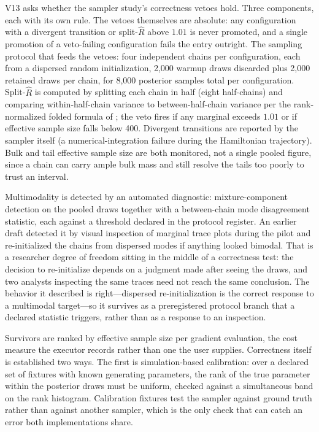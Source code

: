 V13 asks whether the sampler study's correctness vetoes hold. Three
components, each with its own rule. The vetoes themselves are
absolute: any configuration with a divergent transition or
split-$\widehat{R}$ above $1.01$ is never promoted, and a single
promotion of a veto-failing configuration fails the entry outright.
The sampling protocol that feeds the vetoes: four independent chains
per configuration, each from a dispersed random initialization, 2,000
warmup draws discarded plus 2,000 retained draws per chain, for 8,000
posterior samples total per configuration. Split-$\widehat{R}$ is
computed by splitting each chain in half (eight half-chains) and
comparing within-half-chain variance to between-half-chain variance
per the rank-normalized folded formula of \citet{vehtari2021rhat}; the
veto fires if any marginal exceeds $1.01$ or if effective sample size
falls below 400. Divergent transitions are reported by the sampler
itself (a numerical-integration failure during the Hamiltonian
trajectory). Bulk and tail effective sample size are both monitored, not
a single pooled figure, since a chain can carry ample bulk mass and
still resolve the tails too poorly to trust an interval.

Multimodality is detected by an automated diagnostic: mixture-component
detection on the pooled draws together with a between-chain mode
disagreement statistic, each against a threshold declared in the
protocol register. An earlier draft detected it by visual inspection of
marginal trace plots during the pilot and re-initialized the chains from
dispersed modes if anything looked bimodal. That is a researcher degree
of freedom sitting in the middle of a correctness test: the decision to
re-initialize depends on a judgment made after seeing the draws, and two
analysts inspecting the same traces need not reach the same conclusion.
The behavior it described is right—dispersed re-initialization is the
correct response to a multimodal target—so it survives as a
preregistered protocol branch that a declared statistic triggers, rather
than as a response to an inspection.

Survivors are ranked by effective sample size per gradient evaluation,
the cost measure the executor records rather than one the user
supplies. Correctness itself is established two ways. The first is
simulation-based calibration: over a declared set of fixtures with known
generating parameters, the rank of the true parameter within the
posterior draws must be uniform, checked against a simultaneous band on
the rank histogram. Calibration fixtures test the sampler against
ground truth rather than against another sampler, which is the only
check that can catch an error both implementations share.

